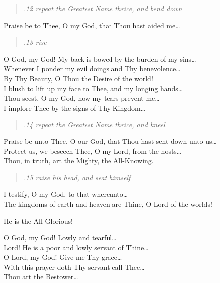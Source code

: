 \documentclass[14pt]{extarticle}
\begin{document}
\begin{hafez}{}{}
  \begin{quote}
    \emph{.12 repeat the Greatest Name thrice, and bend down}
  \end{quote}

  Praise be to Thee, O my God, that Thou hast aided me\dots{}

  \begin{quote}
    \emph{.13 rise}
  \end{quote}

  O God, my God! My back is bowed by the burden of my sins\dots{} \\
  Whenever I ponder my evil doings and Thy benevolence\dots{} \\
  By Thy Beauty, O Thou the Desire of the world! \\
  I blush to lift up my face to Thee, and my longing hands\dots{} \\
  Thou seest, O my God, how my tears prevent me\dots{} \\
  I implore Thee by the signs of Thy Kingdom\dots{}

  \begin{quote}
    \emph{.14 repeat the Greatest Name thrice, and kneel}
  \end{quote}

  Praise be unto Thee, O our God, that Thou hast sent down unto us\dots{} \\
  Protect us, we beseech Thee, O my Lord, from the hosts\dots{} \\
  Thou, in truth, art the Mighty, the All-Knowing.

  \begin{quote}
    \emph{.15 raise his head, and seat himself}
  \end{quote}

  I testify, O my God, to that whereunto\dots{} \\
  The kingdoms of earth and heaven are Thine, O Lord of the worlds!
\end{hafez}{}

\newpage

\begin{hafez}{}{}
  He is the All-Glorious!

  O God, my God! Lowly and tearful\dots{} \\
  Lord! He is a poor and lowly servant of Thine\dots{} \\
  O Lord, my God! Give me Thy grace\dots{} \\
  With this prayer doth Thy servant call Thee\dots{} \\
  Thou art the Bestower\dots{}
\end{hafez}
\end{document}
